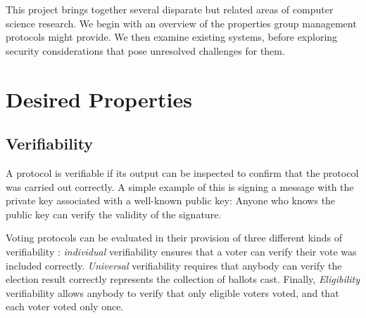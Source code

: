 %
%
%
This project brings together several disparate but related areas of computer
science research. We begin with an overview of the properties group management
protocols might provide. We then examine existing systems, before exploring
security considerations that pose unresolved  challenges for them.
%
\section{Desired Properties}
  \subsection{Verifiability}\label{Subsection:verif}
  A protocol is verifiable if its output can be inspected to confirm that the
  protocol was carried out correctly. A simple example of this is signing a
  message with the private key associated with a well-known public key: Anyone
  who knows the public key can verify the validity of the signature.

  Voting protocols can be evaluated in their provision of three different
  kinds of verifiability \cite{kremer_election_2010}: \emph{individual}
  verifiability ensures that a voter can verify their vote was included
  correctly. \emph{Universal} verifiability requires that anybody can verify
  the election result correctly represents the collection of ballots cast.
  Finally, \emph{Eligibility} verifiability allows anybody to verify that
  only eligible voters voted, and that each voter voted only once.

